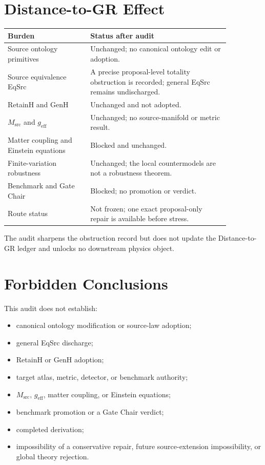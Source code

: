 \documentclass[11pt]{article}
\begin{document}
\section{Distance-to-GR Effect}

\begin{longtable}{p{0.32\linewidth}p{0.54\linewidth}}
\toprule
Burden & Status after audit \\
\midrule
Source ontology primitives & Unchanged; no canonical ontology edit or adoption. \\
Source equivalence EqSrc & A precise proposal-level totality obstruction is recorded; general EqSrc remains undischarged. \\
RetainH and GenH & Unchanged and not adopted. \\
\(M_{\mathrm{src}}\) and \(g_{\mathrm{eff}}\) & Unchanged; no source-manifold or metric result. \\
Matter coupling and Einstein equations & Blocked and unchanged. \\
Finite-variation robustness & Unchanged; the local countermodels are not a robustness theorem. \\
Benchmark and Gate Chair & Blocked; no promotion or verdict. \\
Route status & Not frozen; one exact proposal-only repair is available before stress. \\
\bottomrule
\end{longtable}

The audit sharpens the obstruction record but does not update the
Distance-to-GR ledger and unlocks no downstream physics object.

\section{Forbidden Conclusions}

This audit does not establish:
\begin{itemize}[leftmargin=*]
  \item canonical ontology modification or source-law adoption;
  \item general EqSrc discharge;
  \item RetainH or GenH adoption;
  \item target atlas, metric, detector, or benchmark authority;
  \item \(M_{\mathrm{src}}\), \(g_{\mathrm{eff}}\), matter coupling, or
  Einstein equations;
  \item benchmark promotion or a Gate Chair verdict;
  \item completed derivation;
  \item impossibility of a conservative repair, future source-extension
  impossibility, or global theory rejection.
\end{itemize}
\end{document}
